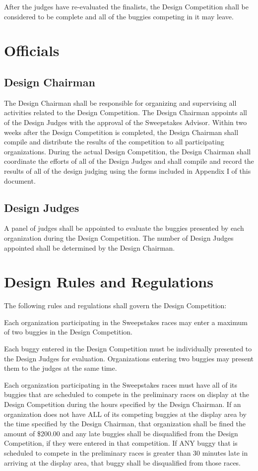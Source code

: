After the judges have re-evaluated the finalists, the Design Competition shall be considered to be complete and all of the buggies competing in it may leave.

\section{Officials}

\subsection{Design Chairman}

The Design Chairman shall be responsible for organizing and supervising all activities related to the Design Competition. The Design Chairman appoints all of the Design Judges with the approval of the Sweepstakes Advisor. Within two weeks after the Design Competition is completed, the Design Chairman shall compile and distribute the results of the competition to all participating organizations. During the actual Design Competition, the Design Chairman shall coordinate the efforts of all of the Design Judges and shall compile and record the results of all of the design judging using the forms included in Appendix I of this document.

\subsection{Design Judges}

A panel of judges shall be appointed to evaluate the buggies presented by each organization during the Design Competition. The number of Design Judges appointed shall be determined by the Design Chairman.

\section{Design Rules and Regulations}
The following rules and regulations shall govern the Design Competition:

Each organization participating in the Sweepstakes races may enter a maximum of two buggies in the Design Competition.

Each buggy entered in the Design Competition must be individually presented to the Design Judges for evaluation. Organizations entering two buggies may present them to the judges at the same time.

Each organization participating in the Sweepstakes races must have all of its buggies that are scheduled to compete in the preliminary races on display at the Design Competition during the hours specified by the Design Chairman. If an organization does not have ALL of its competing buggies at the display area by the time specified by the Design Chairman, that organization shall be fined the amount of \$200.00 and any late buggies shall be disqualified from the Design Competition, if they were entered in that competition. If ANY buggy that is scheduled to compete in the preliminary races is greater than 30 minutes late in arriving at the display area, that buggy shall be disqualified from those races.

